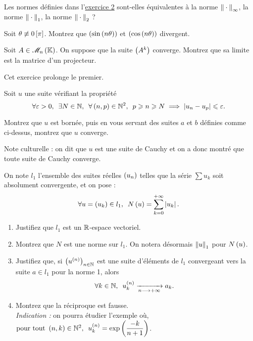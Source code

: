 \begin{exopss}[Exercice 4]
Les normes définies dans l'\hyperref[exo:1.2]{exercice 2} sont-elles équivalentes à la norme \(\norme{}_\infty\), la norme \(\norme{}_1\), la norme \(\norme{}_2\) ?
\end{exopss}

\begin{exops}[Exercice 5]
Soit \(\theta\not\equiv0\left[\pi\right]\). Montrez que \(\left(\sin\left(n\theta\right)\right)\) et \(\left(\cos\left(n\theta\right)\right)\) divergent.
\end{exops}

\begin{exops}[Exercice 6]
Soit \(A\in\M{n}\). On suppose que la suite \(\left(A^k\right)\) converge. Montrez que sa limite est la matrice d'un projecteur.
\end{exops}



\begin{exoss}[Exercice 7]
Cet exercice prolonge le premier.

Soit \(u\) une suite vérifiant la propriété \[\quantifs{\forall\epsilon>0;\exists N\in\N;\forall\paren{n,p}\in\N^2}p\geq n\geq N\imp\abs{u_n-u_p}\leq\epsilon.\]

Montrez que \(u\) est bornée, puis en vous servant des suites \(a\) et \(b\) définies comme ci-dessus, montrez que \(u\) converge.

Note culturelle : on dit que \(u\) est une suite de Cauchy et on a donc montré que toute suite de Cauchy converge.
\end{exoss}



\begin{exopss}[Exercice 8]
On note \(l_1\) l'ensemble des suites réelles \(\left(u_n\right)\) telles que la série \(\sum u_k\) soit absolument convergente, et on pose : \[\quantifs{\forall u=\paren{u_k}\in l_1}N\paren{u}=\sum_{k=0}^{\pinf}\abs{u_k}.\]

\begin{enumerate}
    \item Justifiez que \(l_1\) est un \(\mathbb{R}\)-espace vectoriel. \\
    \item Montrez que \(N\) est une norme sur \(l_1\). On notera désormais \(\norme{u}_1\) pour \(N\left(u\right)\). \\
    \item Justifiez que, si \(\left(u^{\left(n\right)}\right)_{n\in\mathbb{N}}\) est une suite d'éléments de \(l_1\) convergeant vers la suite \(a\in l_1\) pour la norme 1, alors \[\quantifs{\forall k\in\N}u_k\deriv{n}\tendqd{n\to\pinf}a_k.\]
    \item Montrez que la réciproque est fausse. \\ \textit{Indication :} on pourra étudier l'exemple où, \(\quantifs{\tpt\paren{n,k}\in\N^2}u_k\deriv{n}=\exp\paren{\dfrac{-k}{n+1}}\).
\end{enumerate}
\end{exopss}



